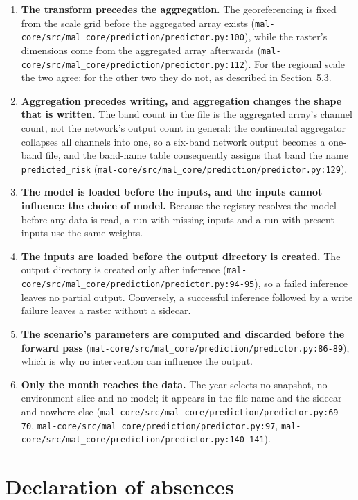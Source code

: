\documentclass[11pt,a4paper]{article}
\newcommand{\code}[1]{\texttt{#1}}
\begin{document}
\begin{enumerate}
\item \textbf{The transform precedes the aggregation.} The georeferencing is
fixed from the scale grid before the aggregated array exists
(\code{mal-core/src/mal\_core/prediction/predictor.py:100}), while the
raster's dimensions come from the aggregated array afterwards
(\code{mal-core/src/mal\_core/prediction/predictor.py:112}). For the
regional scale the two agree; for the other two they do not, as described in
Section~5.3.
\item \textbf{Aggregation precedes writing, and aggregation changes the shape
that is written.} The band count in the file is the aggregated array's
channel count, not the network's output count in general: the continental
aggregator collapses all channels into one, so a six-band network output
becomes a one-band file, and the band-name table consequently assigns that
band the name \code{predicted\_risk}
(\code{mal-core/src/mal\_core/prediction/predictor.py:129}).
\item \textbf{The model is loaded before the inputs, and the inputs cannot
influence the choice of model.} Because the registry resolves the model
before any data is read, a run with missing inputs and a run with present
inputs use the same weights.
\item \textbf{The inputs are loaded before the output directory is created.}
The output directory is created only after inference
(\code{mal-core/src/mal\_core/prediction/predictor.py:94-95}), so a failed
inference leaves no partial output. Conversely, a successful inference
followed by a write failure leaves a raster without a sidecar.
\item \textbf{The scenario's parameters are computed and discarded before the
forward pass} (\code{mal-core/src/mal\_core/prediction/predictor.py:86-89}),
which is why no intervention can influence the output.
\item \textbf{Only the month reaches the data.} The year selects no
snapshot, no environment slice and no model; it appears in the file name and
the sidecar and nowhere else
(\code{mal-core/src/mal\_core/prediction/predictor.py:69-70},
\code{mal-core/src/mal\_core/prediction/predictor.py:97},
\code{mal-core/src/mal\_core/prediction/predictor.py:140-141}).
\end{enumerate}

\section{Declaration of absences}
\end{document}
